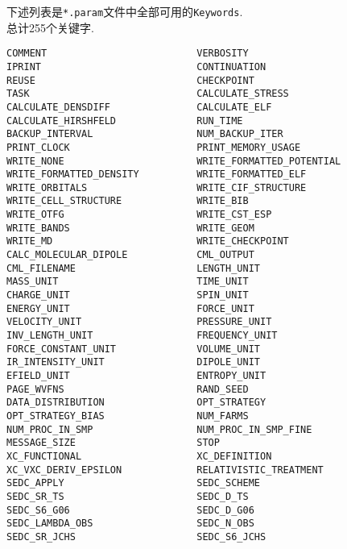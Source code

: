 \documentclass[a4paper, 10pt]{article}
\begin{document}
        下述列表是\verb|*.param|文件中全部可用的\verb|Keywords|.\\
        总计255个关键字.
        \begin{lstlisting}[numbers=right]
COMMENT                          VERBOSITY                        
IPRINT                           CONTINUATION                     
REUSE                            CHECKPOINT                       
TASK                             CALCULATE_STRESS                 
CALCULATE_DENSDIFF               CALCULATE_ELF                    
CALCULATE_HIRSHFELD              RUN_TIME                         
BACKUP_INTERVAL                  NUM_BACKUP_ITER                  
PRINT_CLOCK                      PRINT_MEMORY_USAGE               
WRITE_NONE                       WRITE_FORMATTED_POTENTIAL        
WRITE_FORMATTED_DENSITY          WRITE_FORMATTED_ELF              
WRITE_ORBITALS                   WRITE_CIF_STRUCTURE              
WRITE_CELL_STRUCTURE             WRITE_BIB                        
WRITE_OTFG                       WRITE_CST_ESP                    
WRITE_BANDS                      WRITE_GEOM                      
WRITE_MD                         WRITE_CHECKPOINT                
CALC_MOLECULAR_DIPOLE            CML_OUTPUT                      
CML_FILENAME                     LENGTH_UNIT                     
MASS_UNIT                        TIME_UNIT                       
CHARGE_UNIT                      SPIN_UNIT                       
ENERGY_UNIT                      FORCE_UNIT                      
VELOCITY_UNIT                    PRESSURE_UNIT                  
INV_LENGTH_UNIT                  FREQUENCY_UNIT                 
FORCE_CONSTANT_UNIT              VOLUME_UNIT                    
IR_INTENSITY_UNIT                DIPOLE_UNIT                    
EFIELD_UNIT                      ENTROPY_UNIT                   
PAGE_WVFNS                       RAND_SEED                      
DATA_DISTRIBUTION                OPT_STRATEGY                   
OPT_STRATEGY_BIAS                NUM_FARMS                      
NUM_PROC_IN_SMP                  NUM_PROC_IN_SMP_FINE           
MESSAGE_SIZE                     STOP                           
XC_FUNCTIONAL                    XC_DEFINITION                  
XC_VXC_DERIV_EPSILON             RELATIVISTIC_TREATMENT         
SEDC_APPLY                       SEDC_SCHEME                    
SEDC_SR_TS                       SEDC_D_TS                      
SEDC_S6_G06                      SEDC_D_G06                     
SEDC_LAMBDA_OBS                  SEDC_N_OBS                     
SEDC_SR_JCHS                     SEDC_S6_JCHS                   

\end{lstlisting}
\end{document}
